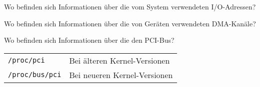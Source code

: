 \begin{flashcard}[Folder]{Wo befinden sich Informationen über die vom System verwendeten I/O-Adressen?}
	
\end{flashcard}

\begin{flashcard}[Folder]{Wo befinden sich Informationen über die von Geräten verwendeten DMA-Kanäle?}
	
\end{flashcard}

\begin{flashcard}[Folder]{Wo befinden sich Informationen über die den PCI-Bus?}
	
	\begin{tabular}{ll}
		\texttt{/proc/pci} & Bei älteren Kernel-Versionen\\
		\texttt{/proc/bus/pci} & Bei neueren Kernel-Versionen\\
	\end{tabular}
\end{flashcard}